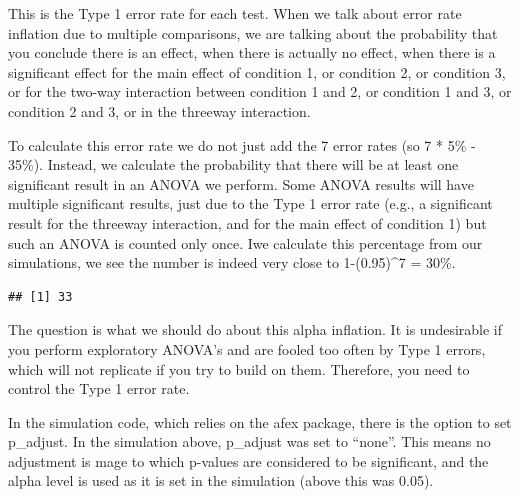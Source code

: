 \documentclass[]{book}
\newenvironment{Shaded}{\begin{snugshade}}{\end{snugshade}}
\newcommand{\ControlFlowTok}[1]{\textcolor[rgb]{0.13,0.29,0.53}{\textbf{#1}}}
\newcommand{\DecValTok}[1]{\textcolor[rgb]{0.00,0.00,0.81}{#1}}
\newcommand{\KeywordTok}[1]{\textcolor[rgb]{0.13,0.29,0.53}{\textbf{#1}}}
\newcommand{\NormalTok}[1]{#1}
\newcommand{\OperatorTok}[1]{\textcolor[rgb]{0.81,0.36,0.00}{\textbf{#1}}}
\newcommand{\StringTok}[1]{\textcolor[rgb]{0.31,0.60,0.02}{#1}}
\begin{document}
This is the Type 1 error rate for each test. When we talk about error rate inflation due to multiple comparisons, we are talking about the probability that you conclude there is an effect, when there is actually no effect, when there is a significant effect for the main effect of condition 1, or condition 2, or condition 3, or for the two-way interaction between condition 1 and 2, or condition 1 and 3, or condition 2 and 3, or in the threeway interaction.

To calculate this error rate we do not just add the 7 error rates (so 7 * 5\% - 35\%). Instead, we calculate the probability that there will be at least one significant result in an ANOVA we perform. Some ANOVA results will have multiple significant results, just due to the Type 1 error rate (e.g., a significant result for the threeway interaction, and for the main effect of condition 1) but such an ANOVA is counted only once. Iwe calculate this percentage from our simulations, we see the number is indeed very close to 1-(0.95)\^{}7 = 30\%.

\begin{Shaded}
\end{Shaded}

\begin{verbatim}
## [1] 33
\end{verbatim}

The question is what we should do about this alpha inflation. It is undesirable if you perform exploratory ANOVA's and are fooled too often by Type 1 errors, which will not replicate if you try to build on them. Therefore, you need to control the Type 1 error rate.

In the simulation code, which relies on the afex package, there is the option to set p\_adjust. In the simulation above, p\_adjust was set to ``none''. This means no adjustment is mage to which p-values are considered to be significant, and the alpha level is used as it is set in the simulation (above this was 0.05).
\end{document}
